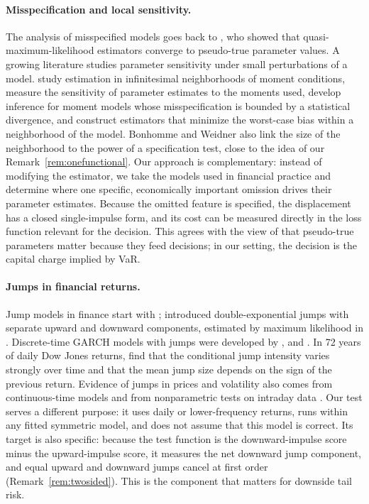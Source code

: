 \documentclass[11pt,a4paper]{article}
\theoremstyle{definition}
\theoremstyle{remark}
\begin{document}
\paragraph{Misspecification and local sensitivity.} The analysis of misspecified models goes back to \citet{white1982}, who showed that quasi-maximum-likelihood estimators converge to pseudo-true parameter values. A growing literature studies parameter sensitivity under small perturbations of a model. \citet{kitamura2013} study estimation in infinitesimal neighborhoods of moment conditions, \citet{andrews2017} measure the sensitivity of parameter estimates to the moments used, \citet{chen2024} develop inference for moment models whose misspecification is bounded by a statistical divergence, and \citet{bonhomme2022} construct estimators that minimize the worst-case bias within a neighborhood of the model. Bonhomme and Weidner also link the size of the neighborhood to the power of a specification test, close to the idea of our Remark~\ref{rem:onefunctional}. Our approach is complementary: instead of modifying the estimator, we take the models used in financial practice and determine where one specific, economically important omission drives their parameter estimates. Because the omitted feature is specified, the displacement has a closed single-impulse form, and its cost can be measured directly in the loss function relevant for the decision. This agrees with the view of \citet{andrews2026} that pseudo-true parameters matter because they feed decisions; in our setting, the decision is the capital charge implied by VaR.

\paragraph{Jumps in financial returns.} Jump models in finance start with \citet{merton1976}; \citet{kou2002} introduced double-exponential jumps with separate upward and downward components, estimated by maximum likelihood in \citet{ramezani2007}. Discrete-time GARCH models with jumps were developed by \citet{chan2002}, \citet{maheu2004} and \citet{duan2006}. In 72 years of daily Dow Jones returns, \citet{chan2002} find that the conditional jump intensity varies strongly over time and that the mean jump size depends on the sign of the previous return. Evidence of jumps in prices and volatility also comes from continuous-time models \citep{eraker2003} and from nonparametric tests on intraday data \citep{bns2006,leemykland2008}. Our test serves a different purpose: it uses daily or lower-frequency returns, runs within any fitted symmetric model, and does not assume that this model is correct. Its target is also specific: because the test function is the downward-impulse score minus the upward-impulse score, it measures the net downward jump component, and equal upward and downward jumps cancel at first order (Remark~\ref{rem:twosided}). This is the component that matters for downside tail risk.
\end{document}
